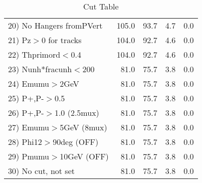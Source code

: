 \begin{table}[h!]
\begin{tabular}{||l||r|r|r|r||}
 20) No Hangers fromPVert &       105.0 &        93.7 &         4.7 &         0.0 \\
 21) Pz$>$0 for tracks    &       104.0 &        92.7 &         4.6 &         0.0 \\
 22) Thprimord$<$0.4      &       104.0 &        92.7 &         4.6 &         0.0 \\
 23) Nunh*fracunh$<$200   &        81.0 &        75.7 &         3.8 &         0.0 \\
 24) Emumu$>$2GeV         &        81.0 &        75.7 &         3.8 &         0.0 \\
 25) P+,P-$>$0.5          &        81.0 &        75.7 &         3.8 &         0.0 \\
 26) P+,P-$>$1.0 (2.5mux) &        81.0 &        75.7 &         3.8 &         0.0 \\
 27) Emumu$>$5GeV  (8mux) &        81.0 &        75.7 &         3.8 &         0.0 \\
 28) Phi12$>$90deg  (OFF) &        81.0 &        75.7 &         3.8 &         0.0 \\
 29) Pmumu$>$10GeV  (OFF) &        81.0 &        75.7 &         3.8 &         0.0 \\
 30) No cut, not set      &        81.0 &        75.7 &         3.8 &         0.0 \\
 \hline
 \hline
 \end{tabular}
 \caption{Cut Table \cohrp  }
 \label{tab-cut_crhop}
 \end{table}

